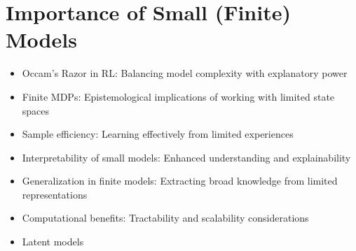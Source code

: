 \section{Importance of Small (Finite) Models}
\begin{itemize}
    \item Occam's Razor in RL: Balancing model complexity with explanatory power
    \item Finite MDPs: Epistemological implications of working with limited state spaces
    \item Sample efficiency: Learning effectively from limited experiences
    \item Interpretability of small models: Enhanced understanding and explainability
    \item Generalization in finite models: Extracting broad knowledge from limited representations
    \item Computational benefits: Tractability and scalability considerations
    \item Latent models
\end{itemize}


